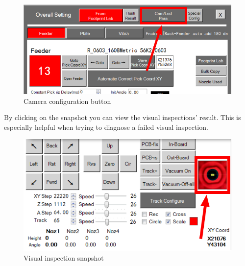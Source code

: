 \documentclass[a4paper,10pt]{report}
\begin{document}
 \begin{figure}[!htb]
 \centering
 \includegraphics[width=1\textwidth]{scrot27.png}
 \caption{Camera configuration button}
\end{figure}
By clicking on the snapshot you can view the visual inspections' result.
This is especially helpful when trying to diagnose a failed visual inspection.
 \begin{figure}[!htb]
 \centering
 \includegraphics[width=1\textwidth]{scrot28.png}
 \caption{Visual inspection snapshot}
\end{figure}
\newpage
\end{document}
